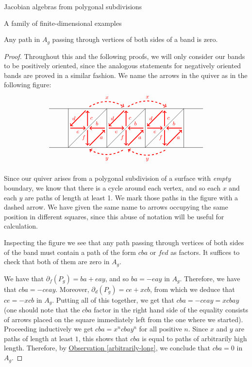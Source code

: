 \begin{chapter}{Jacobian algebras from polygonal subdivisions}
\begin{section}{A family of finite-dimensional examples}
\begin{lemma}\label{band-sides} Any path in $A_g$ passing through vertices of both sides of a band is zero.
\end{lemma}
\begin{proof} Throughout this and the following proofs, we will only consider our bands to be positively oriented, since the analogous statements for negatively oriented bands are proved in a similar fashion. We name the arrows in the quiver as in the following figure:
\[
\begin{tikzpicture}[text width=1.5mm, font=\footnotesize]
\draw (-4, 0) -- (4, 0);
\draw (-4, 2) -- (4, 2);
\foreach \x in {-3,-1,...,3}
\draw (\x, 0) -- (\x, 2);
\foreach \x in {-3,-1,1}
{
\draw (\x,0) -- (\x+2, 2);
\draw [->, red, very thick] (\x+1.9, 1) to node[above] {$b$} (\x+1.1, 1);
\draw[->, red, very thick] (\x+1, 0.9) to node[left]{$f$} (\x+1, 0.1);
\draw[->, red, very thick] (\x+1.1, 0.1) to node[right]{$a$} (\x+1.9, 0.9);
\draw[->, red, very thick] (\x+1, 1.1) to node[right]{$c$} (\x+1, 1.9);
\draw[->, red, very thick] (\x+0.9, 1.9) to node[left]{$d$} (\x+0.1, 1.1);
\draw[->, red, very thick] (\x+0.1, 1) to node[below]{$e$} (\x+0.9, 1);
}

\draw[->, red, dashed, very thick] (-1.9, 2.1) to [bend left] node[above]{$x$} (-0.1, 2.1);
\draw[->, red, dashed, very thick] (0.1, 2.1) to [bend left] node[above]{$x$} (2.1, 2.1);
\draw[<-, red, dashed, very thick] (-1.9, -0.1) to [bend right] node[below]{$y$} (-0.1, -0.1);
\draw[<-, red, dashed, very thick] (0.1, -0.1) to [bend right] node[below]{$y$} (2.1, -0.1);
\end{tikzpicture}
\]

Since our quiver arises from a polygonal subdivision of a surface with \emph{empty} boundary, we know that there is a cycle around each vertex, and so each $x$ and each $y$ are paths of length at least 1. We mark those paths in the figure with a dashed arrow. We have given the same name to arrows occupying the same position in different squares, since this abuse of notation will be useful for calculation.

Inspecting the figure we see that any path passing through vertices of both sides of the band must contain a path of the form $cba$ or $fed$ as factors. It suffices to check that both of them are zero in $A_g$.

We have that $\partial_f(P_g) = ba + eay$, and so $ba  = -eay$ in $A_g$. Therefore, we have that $cba = -ceay$. Moreover, $\partial_d(P_g) = ce + xcb$, from which we deduce that $ce = -xcb$ in $A_g$. Putting all of this together, we get that $cba=-ceay=xcbay$ (one should note that the $cba$ factor in the right hand side of the equality consists of arrows placed on the square immediately left from the one where we started). Proceeding inductively we get $cba=x^ncbay^n$ for all positive $n$. Since $x$ and $y$ are paths of length at least $1$, this shows that $cba$ is equal to paths of arbitrarily high length. Therefore, by \hyperref[arbitrarily-long]{Observation \ref*{arbitrarily-long}}, we conclude that $cba=0$ in $A_g$.


\end{proof}
\end{section}
\end{chapter}
